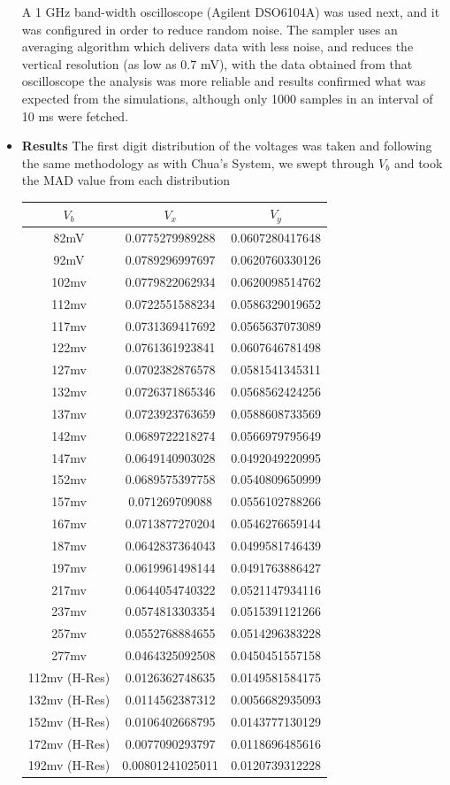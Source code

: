 \begin{itemize}
A 1 GHz band-width oscilloscope (Agilent DSO6104A) was used next, and it was configured in order to reduce random noise. The sampler uses an averaging algorithm which delivers data with less noise, and reduces the vertical resolution (as low as 0.7 mV), with the data obtained from that oscilloscope the analysis was more reliable and results confirmed what was expected from the simulations, although only 1000 samples in an interval of 10 ms were fetched.
  \item \textbf{Results}
The first digit distribution of the voltages was taken and following the same methodology as with Chua's System, we swept through $V_b$ and took the MAD value from each distribution
\begin{center}
  \begin{tabular}{ c | c | c }
    \hline
$V_b$  & $V_x$&$V_y$\\ \hline
82mV & 0.0775279989288 & 0.0607280417648 \\ \hline
92mV & 0.0789296997697 &  0.0620760330126 \\ \hline
102mv & 0.0779822062934 & 0.0620098514762  \\ \hline
112mv & 0.0722551588234 & 0.0586329019652  \\ \hline
117mv & 0.0731369417692 & 0.0565637073089  \\ \hline
122mv & 0.0761361923841 & 0.0607646781498  \\ \hline
127mv & 0.0702382876578 & 0.0581541345311  \\ \hline
132mv & 0.0726371865346 & 0.0568562424256  \\ \hline
137mv & 0.0723923763659 & 0.0588608733569  \\ \hline
142mv & 0.0689722218274 & 0.0566979795649  \\ \hline
147mv & 0.0649140903028 & 0.0492049220995  \\ \hline
152mv & 0.0689575397758 & 0.0540809650999  \\ \hline
157mv &0.071269709088 & 0.0556102788266   \\ \hline
167mv &0.0713877270204 & 0.0546276659144  \\ \hline
187mv & 0.0642837364043 & 0.0499581746439  \\ \hline
197mv &0.0619961498144 & 0.0491763886427  \\ \hline
217mv & 0.0644054740322 & 0.0521147934116  \\ \hline
237mv & 0.0574813303354 & 0.0515391121266  \\ \hline
257mv & 0.0552768884655 & 0.0514296383228  \\ \hline
277mv & 0.0464325092508 & 0.0450451557158  \\ \hline
112mv (H-Res) &0.0126362748635 & 0.0149581584175  \\ \hline
132mv  (H-Res)& 0.0114562387312 & 0.0056682935093  \\ \hline
152mv  (H-Res)& 0.0106402668795 & 0.0143777130129  \\ \hline
172mv  (H-Res)& 0.0077090293797 & 0.0118696485616  \\ \hline
192mv  (H-Res)& 0.00801241025011 & 0.0120739312228  \\ \hline


\end{tabular}
\end{center}
\end{itemize}
